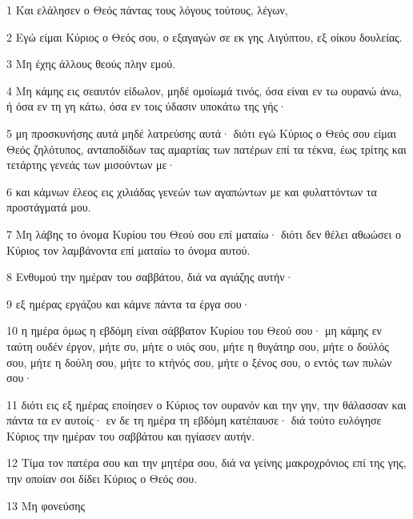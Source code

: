 \par 1 Και ελάλησεν ο Θεός πάντας τους λόγους τούτους, λέγων,
\par 2 Εγώ είμαι Κύριος ο Θεός σου, ο εξαγαγών σε εκ γης Αιγύπτου, εξ οίκου δουλείας.
\par 3 Μη έχης άλλους θεούς πλην εμού.
\par 4 Μη κάμης εις σεαυτόν είδωλον, μηδέ ομοίωμά τινός, όσα είναι εν τω ουρανώ άνω, ή όσα εν τη γη κάτω, όσα εν τοις ύδασιν υποκάτω της γής·
\par 5 μη προσκυνήσης αυτά μηδέ λατρεύσης αυτά· διότι εγώ Κύριος ο Θεός σου είμαι Θεός ζηλότυπος, ανταποδίδων τας αμαρτίας των πατέρων επί τα τέκνα, έως τρίτης και τετάρτης γενεάς των μισούντων με·
\par 6 και κάμνων έλεος εις χιλιάδας γενεών των αγαπώντων με και φυλαττόντων τα προστάγματά μου.
\par 7 Μη λάβης το όνομα Κυρίου του Θεού σου επί ματαίω· διότι δεν θέλει αθωώσει ο Κύριος τον λαμβάνοντα επί ματαίω το όνομα αυτού.
\par 8 Ενθυμού την ημέραν του σαββάτου, διά να αγιάζης αυτήν·
\par 9 εξ ημέρας εργάζου και κάμνε πάντα τα έργα σου·
\par 10 η ημέρα όμως η εβδόμη είναι σάββατον Κυρίου του Θεού σου· μη κάμης εν ταύτη ουδέν έργον, μήτε συ, μήτε ο υιός σου, μήτε η θυγάτηρ σου, μήτε ο δούλός σου, μήτε η δούλη σου, μήτε το κτήνός σου, μήτε ο ξένος σου, ο εντός των πυλών σου·
\par 11 διότι εις εξ ημέρας εποίησεν ο Κύριος τον ουρανόν και την γην, την θάλασσαν και πάντα τα εν αυτοίς· εν δε τη ημέρα τη εβδόμη κατέπαυσε· διά τούτο ευλόγησε Κύριος την ημέραν του σαββάτου και ηγίασεν αυτήν.
\par 12 Τίμα τον πατέρα σου και την μητέρα σου, διά να γείνης μακροχρόνιος επί της γης, την οποίαν σοι δίδει Κύριος ο Θεός σου.
\par 13 Μη φονεύσης

